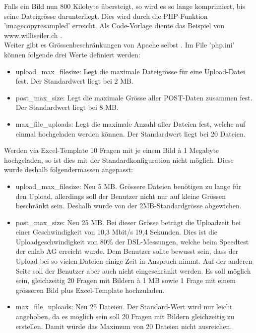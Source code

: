 Falls ein Bild nun 800 Kilobyte übersteigt, so wird es so lange komprimiert, bis seine Dateigrösse darunterliegt. Dies wird durch die PHP-Funktion 'imagecopyresampled' erreicht. Als Code-Vorlage diente das Beispiel von www.williseiler.ch \cite{willis_php}. \\

Weiter gibt es Grössenbeschränkungen von Apache selbst \cite{stackoverflow_largeFilePHP}. Im File 'php.ini' können folgende drei Werte definiert werden:
\begin{itemize}
	\item upload\_max\_filesize: Legt die maximale Dateigrösse für eine Upload-Datei fest. Der Standardwert liegt bei 2 MB.
	\item post\_max\_size: Legt die maximale Grösse aller POST-Daten zusammen fest. Der Standardwert liegt bei 8 MB.
	\item max\_file\_uploads: Legt die maximale Anzahl aller Dateien fest, welche auf einmal hochgeladen werden können. Der Standardwert liegt bei 20 Dateien.
\end{itemize}

Werden via Excel-Template 10 Fragen mit je einem Bild à 1 Megabyte hochgeladen, so ist dies mit der Standardkonfiguration nicht möglich. Diese wurde deshalb folgendermassen angepasst:
\begin{itemize}
	\item upload\_max\_filesize: Neu 5 MB. Grössere Dateien benötigen zu lange für den Upload, allerdings soll der Benutzer nicht nur auf kleine Grössen beschränkt sein. Deshalb wurde von der 2MB-Standardgrösse abgewichen.
	\item post\_max\_size: Neu 25 MB. Bei dieser Grösse beträgt die Uploadzeit bei einer Geschwindigkeit von 10,3 Mbit/s 19,4 Sekunden. Dies ist die Uploadgeschwindigkeit von 80\% der DSL-Messungen, welche beim Speedtest der cnlab AG \cite{cnlab_speedtest} erreicht wurde. Dem Benutzer sollte bewusst sein, dass der Upload bei so vielen Dateien einige Zeit in Anspruch nimmt.
	Auf der anderen Seite soll der Benutzer aber auch nicht eingeschränkt werden. Es soll möglich sein, gleichzeitig 20 Fragen mit Bildern à 1 MB sowie 1 Frage mit einem grösseren Bild plus Excel-Template hochzuladen.
	\item max\_file\_uploads: Neu 25 Dateien. Der Standard-Wert wird nur leicht angehoben, da es möglich sein soll 20 Fragen mit Bildern gleichzeitig zu erstellen. Damit würde das Maximum von 20 Dateien nicht ausreichen.
\end{itemize}

